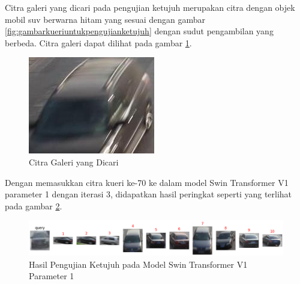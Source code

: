 Citra galeri yang dicari pada pengujian ketujuh merupakan citra dengan objek mobil suv berwarna hitam 
yang sesuai dengan gambar \ref{fig:gambarkueriuntukpengujianketujuh} dengan sudut pengambilan yang berbeda. 
Citra galeri dapat dilihat pada gambar \ref{fig:gambargaleriuntukpengujianketujuh}.

\begin{figure}[h!]
  \centering
  \includegraphics[scale=0.4]{gambar/Gal70_114.jpg}
  \caption{Citra Galeri yang Dicari}
  \label{fig:gambargaleriuntukpengujianketujuh}
\end{figure}

Dengan memasukkan citra kueri ke-70 ke dalam model Swin Transformer V1 parameter 1 dengan iterasi 3, didapatkan hasil 
peringkat seperti yang terlihat pada gambar \ref{fig:hasilpengujianketujuhpadamodelswintransformerv1param1}.

\begin{figure}[h!]
  \centering
  \includegraphics[scale=0.6]{gambar/Que70V1P1IT3.png}
  \caption{Hasil Pengujian Ketujuh pada Model Swin Transformer V1 Parameter 1}
  \label{fig:hasilpengujianketujuhpadamodelswintransformerv1param1}
\end{figure}

